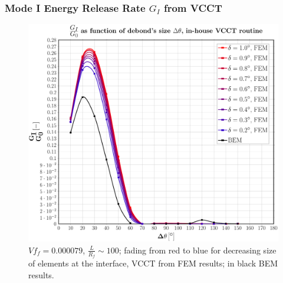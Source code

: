 \documentclass[first,firstsupp,lastsupp,last,hyperref,table]{ETHclass}
\begin{document}
\begin{frame}
\frametitle{\small Mode I Energy Release Rate $G_{I}$ from VCCT}
\vspace{-0.5cm}
\centering
\captionsetup[figure]{font=scriptsize,labelfont=scriptsize}
\begin{figure}[!h]
\centering
\includegraphics[height=0.7\textheight]{2017-07-10_AbqRunSummary_SmallStrain_M-F-VCCT_GI.pdf}
  \caption{\scriptsize $Vf_{f}=0.000079$, $\frac{L}{R_{f}}\sim 100$; fading from red to blue for decreasing size of elements at the interface, VCCT from FEM results; in black BEM results.}
  \label{fig:res1}
\end{figure}
\end{frame}
\end{document}

